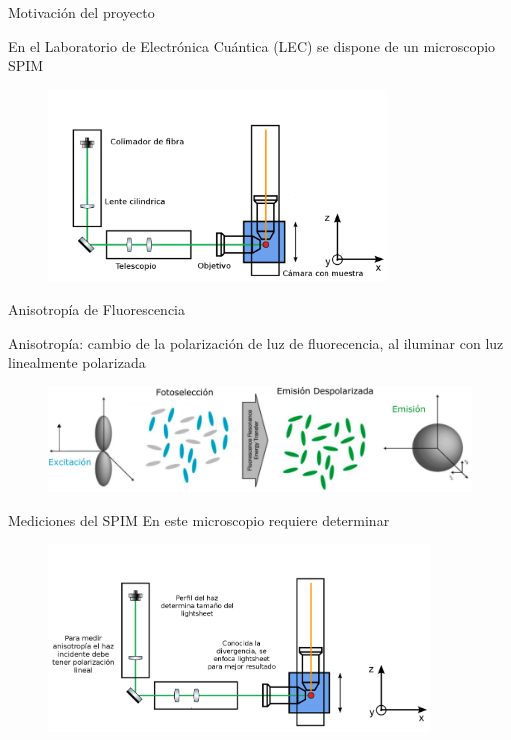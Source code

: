 
\begin{frame}[t]{Motivación del proyecto}

        \centering
        En el Laboratorio de Electrónica Cuántica (LEC) se dispone de un microscopio SPIM    
        \begin{figure}[H]
            \centering
            \includegraphics[width=0.8\textwidth]{fig/spim_anotado}
            \label{fig:spim} 
        \end{figure}
        
    \end{frame}
    
    \begin{frame}{Anisotropía de Fluorescencia}

    Anisotropía: cambio de la polarización de luz de fluorecencia, al iluminar con luz linealmente polarizada

    \begin{figure}
        \centering
        \includegraphics[width=1\textwidth]{fig/fotoseleccion.png}
    \end{figure}
    
   \end{frame}  
    
    
\begin{frame}{Mediciones del SPIM}
    \centering
    En este microscopio requiere determinar       
        \begin{figure}[H]
            \centering
            \includegraphics[width=0.9\textwidth]{fig/spim_mediciones}
            \label{fig:spim} 
        \end{figure}
\end{frame}

